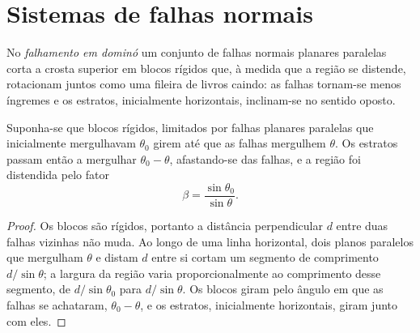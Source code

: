 \begin{omfigure}
\par{}\label{fig:b3:extension-strike-slip:models}
\end{omfigure}

\section{Sistemas de falhas normais}\label{sec:b3:extension-strike-slip:faults}

\begin{definition}\label{def:b3:extension-strike-slip:domino}
No \emph{falhamento em dominó} um conjunto de falhas normais planares
paralelas corta a crosta superior em blocos rígidos que, à medida que a região
se distende, rotacionam juntos como uma fileira de livros caindo: as falhas tornam-se
menos íngremes e os estratos, inicialmente horizontais, inclinam-se no sentido oposto.
\end{definition}

\begin{theorem}\label{thm:b3:extension-strike-slip:domino}
Suponha-se que blocos rígidos, limitados por falhas planares paralelas que inicialmente mergulhavam
$\theta_0$ girem até que as falhas mergulhem $\theta$. Os estratos passam então a mergulhar $\theta_0
- \theta$, afastando-se das falhas, e a região foi distendida pelo
fator
\[
  \beta = \frac{\sin\theta_0}{\sin\theta} .
\]
\end{theorem}

\begin{proof}
Os blocos são rígidos, portanto a distância perpendicular $d$ entre duas
falhas vizinhas não muda. Ao longo de uma linha horizontal, dois planos paralelos
que mergulham $\theta$ e distam $d$ entre si cortam um segmento de comprimento $d/\sin
\theta$; a largura da região varia proporcionalmente ao comprimento desse segmento, de
$d/\sin\theta_0$ para $d/\sin\theta$. Os blocos giram pelo ângulo em que as falhas se achataram,
$\theta_0 - \theta$, e os estratos, inicialmente horizontais,
giram junto com eles.
\end{proof}

